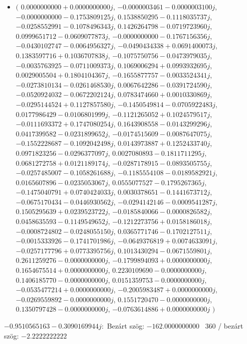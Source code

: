 \documentclass[14pt,a4paper]{article}
\begin{document}
\begin{itemize}
\item
$\big($
$0.0000000000+0.0000000000j$, $-0.0000003461-0.0000003100j$, $-0.0000000000-0.1753809125j$, $0.1538850295-0.1118035737j$, $-0.0258552991-0.1078496343j$, $0.1426264798-0.0719723960j$, $0.0999651712-0.0609077873j$, $-0.0000000000-0.1767156356j$, $-0.0430102747-0.0064956327j$, $-0.0490434338+0.0691400073j$, $0.1383597716+0.1036707838j$, $-0.1075750756-0.0473979035j$, $-0.0035763925-0.0711009373j$, $0.1069006294+0.0993932695j$, $0.0029005504+0.1804104367j$, $-0.1655877757-0.0033524341j$, $-0.0273810134-0.0261468530j$, $0.0067642286-0.0391724590j$, $-0.0520924032-0.0672202124j$, $0.0783474660+0.0010330869j$, $-0.0295144524+0.1127857580j$, $-0.1450549814-0.0705922483j$, $0.0177986429-0.0106801999j$, $-0.1121265052+0.1024579517j$, $-0.0111693372+0.1747080254j$, $0.1643908558-0.0143299296j$, $0.0417399582-0.0231899652j$, $-0.0174515609-0.0087647075j$, $-0.1552228687-0.1092042498j$, $0.0143973887+0.1252433740j$, $0.0971823256-0.0296377097j$, $0.0027080893-0.1811711295j$, $0.0681272758+0.0121189174j$, $-0.0287178915-0.0893505755j$, $-0.0257485007-0.1058261688j$, $-0.1185554108-0.0189582921j$, $0.0165607896-0.0235053067j$, $0.0555077527-0.1795267365j$, $-0.1475040791+0.0740424033j$, $0.0030378651-0.1441673712j$, $-0.0675170434-0.0446930562j$, $-0.0294142146-0.0009541287j$, $0.1505295639+0.0239523722j$, $-0.0185840066-0.0000826582j$, $0.0458635593-0.1149549652j$, $-0.1212273756+0.0158186018j$, $-0.0008724802-0.0248055150j$, $0.0365771746-0.1702127511j$, $-0.0015333926-0.1741701986j$, $-0.0649376819+0.0074633091j$, $-0.0257177796+0.0773395756j$, $0.1013430294-0.0671559801j$, $0.2611259276-0.0000000000j$, $-0.1799894093+0.0000000000j$, $0.1654675514+0.0000000000j$, $0.2230109690-0.0000000000j$, $0.1406185770-0.0000000000j$, $0.0151359753-0.0000000000j$, $-0.0535477214+0.0000000000j$, $-0.2005983487+0.0000000000j$, $-0.0269559892-0.0000000000j$, $0.1551720470-0.0000000000j$, $0.1350797428-0.0000000000j$, $-0.0763614886+0.0000000000j$
$\big)$
\end{itemize}
$-0.9510565163-0.3090169944j$:\
Bezárt szög: $-162.0000000000$ \
360 / bezárt szög: $-2.2222222222$\
\end{document}
